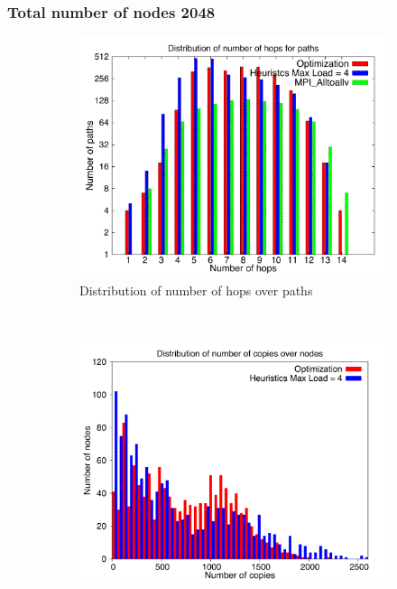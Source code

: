 \documentclass[letter]{article}
\begin{document}
\clearpage
\newpage

\subsubsection {Total number of nodes 2048}



\begin{figure}[!htbp]
        \centering
        \begin{subfigure}[b]{0.49\textwidth}
                \includegraphics[width=\textwidth]{report_figures/2k/hop_histo.pdf}
                \caption{Distribution of number of hops over paths}
                \label{fig:2k_hop}
        \end{subfigure}%
        ~ %
        \begin{subfigure}[b]{0.49\textwidth}
                \includegraphics[width=\textwidth]{report_figures/2k/copy_histo.pdf}

\end{subfigure}
\end{figure}
\end{document}
